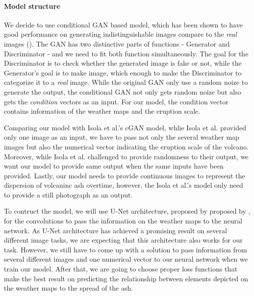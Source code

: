 \documentclass{article}
\begin{document}
\begin{doublespacing}
{  \paragraph{Model structure}
  We decide to use conditional GAN based model, which has been shown to have good performance on 
  generating indistinguishable images compare to the \emph{real} images 
  (\citet{isola2016imagetoimage}). The GAN has two distinctive parts of functions - Generator and 
  Discriminator - and we need to fit both function simultaneously. The goal for the Discriminator is
  to check whether the generated image is fake or not, while the Generator's goal is to make image, 
  which enough to make the Discriminator to categorize it to a \emph{real} image. While the original
  GAN only use a random noize to generate the output, the conditional GAN not only gets random noize
  but also gets the \emph{condition} vectors as an input. For our model, the condition vector 
  contains information of the weather maps and the eruption scale.

  Comparing our model with Isola et al.\citep{isola2016imagetoimage}'s cGAN model, whlie Isola et 
  al. provided only one image as an input, we have to pass not only the several weather map images 
  but also the numerical vector indicating the eruption scale of the volcano. Moreover, while Isola 
  et al.\citep{isola2016imagetoimage} challenged to provide randomness to their output, we want our 
  model to provide same output when the same inputs have been provided. Lastly, our model needs to 
  provide continuous images to represent the dispersion of volcaninc ash overtime, however, the 
  Isola et al.\citep{isola2016imagetoimage}'s model only need to provide a still photograph as an 
  output.

  To contruct the model, we will use U-Net architecture, proposed by proposed by 
  \citet{ronneberger2015unet}, for the convolutions to pass the information on the weather maps to 
  the neural network. As U-Net architecture has achieved a promising result on several different 
  image tasks\citep{isola2016imagetoimage,james2018simtoreal}, we are expecting that this 
  architecture also works for our task. However, we still have to come up with a solution to pass 
  information from several different images and one numerical vector to our neural network when we 
  train our model. After that, we are going to choose proper loss functions that make the best 
  result on predicting the relationship between elements depicted on the weather maps to the spread 
  of the ash.

}
\end{doublespacing}
\end{document}
